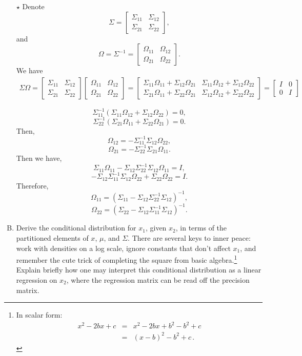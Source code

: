 \documentclass[11pt]{article}
\newcommand{\jie}{$\star$ }
\begin{document}
\begin{enumerate}[(A)]
\jie 
Denote
$$\Sigma = \begin{bmatrix}
\Sigma_{11} & \Sigma_{12} \\
\Sigma_{21} & \Sigma_{22}
\end{bmatrix},$$
and
$$\Omega = \Sigma^{-1} = \begin{bmatrix}
\Omega_{11} & \Omega_{12} \\
\Omega_{21} & \Omega_{22}
\end{bmatrix}.$$
We have
\begin{align*}
    \Sigma \Omega = \begin{bmatrix}
\Sigma_{11} & \Sigma_{12} \\
\Sigma_{21} & \Sigma_{22}
\end{bmatrix}
\begin{bmatrix}
\Omega_{11} & \Omega_{12} \\
\Omega_{21} & \Omega_{22}
\end{bmatrix}
=
\begin{bmatrix}
\Sigma_{11} \Omega_{11} + \Sigma_{12} \Omega_{21} & \Sigma_{11} \Omega_{12} + \Sigma_{12} \Omega_{22} \\
\Sigma_{21} \Omega_{11} + \Sigma_{22} \Omega_{21} & \Sigma_{12} \Omega_{12} + \Sigma_{22} \Omega_{22}
\end{bmatrix}
=
\begin{bmatrix}
I & 0 \\
0 & I
\end{bmatrix}
\end{align*}

$$\Sigma_{11}^{-1} (\Sigma_{11} \Omega_{12} + \Sigma_{12}\Omega_{22}) = 0,$$
$$\Sigma_{22}^{-1} (\Sigma_{21}\Omega_{11} + \Sigma_{22}\Omega_{21}) = 0.$$
Then,
$$\Omega_{12} = - \Sigma_{11}^{-1} \Sigma_{12} \Omega_{22},$$
$$\Omega_{21} = - \Sigma_{22}^{-1} \Sigma_{21} \Omega_{11}.$$
Then we have,
$$\Sigma_{11} \Omega_{11} - \Sigma_{12} \Sigma_{22}^{-1} \Sigma_{12} \Omega_{11} = I,$$
$$-\Sigma_{12} \Sigma_{11}^{-1} \Sigma_{12} \Omega_{22} + \Sigma_{22} \Omega_{22} = I.$$
Therefore,
$$\Omega_{11} = (\Sigma_{11} - \Sigma_{12}\Sigma_{22}^{-1}\Sigma_{12})^{-1},$$
$$\Omega_{22} = (\Sigma_{22} - \Sigma_{12}\Sigma_{11}^{-1} \Sigma_{12})^{-1}.$$

\bigskip 

\item Derive the conditional distribution for $x_1$, given $x_2$, in terms of the partitioned elements of $x$, $\mu$, and $\Sigma$.  There are several keys to inner peace: work with densities on a log scale, ignore constants that don't affect $x_1$, and remember the cute trick of completing the square from basic algebra.\footnote{In scalar form:
\begin{eqnarray*}
x^2 - 2bx + c &=& x^2 - 2bx + b^2 - b^2 + c \\
&=& (x-b)^2 - b^2 + c \, .
\end{eqnarray*}
}
Explain briefly how one may interpret this conditional distribution as a linear regression on $x_2$, where the regression matrix can be read off the precision matrix.

\end{enumerate}
\end{document}
